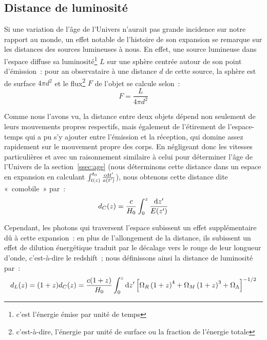 \documentclass[../main/main.tex]{subfiles}
\begin{document}
\subsection{Distance de luminosité}\label{ssec:dl}

Si une variation de l'âge de l'Univers n'aurait pas grande incidence sur notre
rapport au monde, un effet notable de l'histoire de son expansion se remarque
sur les distances des sources lumineuses à nous. En effet, une source lumineuse
dans l'espace diffuse sa luminosité\footnote{c'est l'énergie émise par unité de
temps} $L$ sur une sphère centrée autour de son point d'émission~: pour an
observataire à une distance $d$ de cette source, la sphère est de surface $4\pi
d^2$ et le flux\footnote{c'est-à-dire, l'énergie par unité de surface ou la
fraction de l'énergie totale} $F$ de l'objet se calcule selon~:
\begin{equation}\label{eq:f}
    F = \frac{L}{4\pi d^2}
\end{equation}

Comme nous l'avons vu, la distance entre deux objets dépend non seulement de
leurs mouvements propres respectifs, mais également de l'étirement de
l'espace-temps qui a pu s'y ajouter entre l'émission et la réception, qui domine
assez rapidement sur le mouvement propre des corps. En négligeant donc les
vitesses particulières et avec un raisonnement similaire à celui pour déterminer
l'âge de l'Univers de la section~\ref{ssec:age} (nous déterminons cette distance
dans un espace en expansion en calculant $\int_{t(z)}^{t_0} \frac{c\mathrm{d}
t'}{a(t')}$), nous obtenons cette distance dite «~comobile~» par~:
\begin{equation}
    d_C(z) = \frac{c}{H_0} \int_{0}^{z} \frac{\mathrm{d} z'}{E(z')}
\end{equation}

Cependant, les photons qui traversent l'espace subissent un effet supplémentaire
dû à cette expansion~: en plus de l'allongement de la distance, ils subissent un
effet de dilution énergétique traduit par le décalage vers le rouge de leur
longueur d'onde, c'est-à-dire le redshift~; nous définissons ainsi la distance
de luminosité par~:
\begin{equation}\label{eq:dl}
    d_L(z) = (1+z)d_C(z) = \frac{c(1+z)}{H_0} \int_{0}^{z} \d z'
    \left[
        \Omega_R \left( 1+z \right)^4 +
        \Omega_M \left( 1+z \right)^3 +
        \Omega_\Lambda %
    \right]^{-1/2}
\end{equation}
\end{document}
